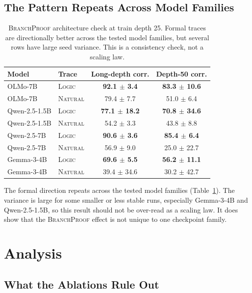 \documentclass[11pt]{article}
\newcommand{\branchproof}{\textsc{BranchProof}}
\newcommand{\logic}{\textsc{Logic}}
\newcommand{\nl}{\textsc{Natural}}
\begin{document}
\subsection{The Pattern Repeats Across Model Families}

\begin{table}[t]
\centering
\small
\begin{tabular}{llcc}
\toprule
Model & Trace & Long-depth corr. & Depth-50 corr. \\
\midrule
OLMo-7B & \logic{} & \textbf{92.1 $\pm$ 3.4} & \textbf{83.3 $\pm$ 10.6} \\
OLMo-7B & \nl{} & 79.4 $\pm$ 7.7 & 51.0 $\pm$ 6.4 \\
\midrule
Qwen-2.5-1.5B & \logic{} & \textbf{77.1 $\pm$ 18.2} & \textbf{70.8 $\pm$ 34.6} \\
Qwen-2.5-1.5B & \nl{} & 54.2 $\pm$ 3.3 & 43.8 $\pm$ 8.8 \\
\midrule
Qwen-2.5-7B & \logic{} & \textbf{90.6 $\pm$ 3.6} & \textbf{85.4 $\pm$ 6.4} \\
Qwen-2.5-7B & \nl{} & 56.9 $\pm$ 9.0 & 25.0 $\pm$ 22.7 \\
\midrule
Gemma-3-4B & \logic{} & \textbf{69.6 $\pm$ 5.5} & \textbf{56.2 $\pm$ 11.1} \\
Gemma-3-4B & \nl{} & 39.4 $\pm$ 34.6 & 30.2 $\pm$ 42.7 \\
\bottomrule
\end{tabular}
\caption{\branchproof{} architecture check at train depth 25. Formal traces are
directionally better across the tested model families, but several rows have
large seed variance. This is a consistency check, not a scaling law.}
\label{tab:architecture}
\end{table}

The formal direction repeats across the tested model families
(Table~\ref{tab:architecture}). The variance is large for some smaller or less
stable runs, especially Gemma-3-4B and Qwen-2.5-1.5B, so this result should not
be over-read as a scaling law. It does show that the \branchproof{} effect is
not unique to one checkpoint family.

\section{Analysis}
\label{sec:analysis}

\subsection{What the Ablations Rule Out}
\end{document}
